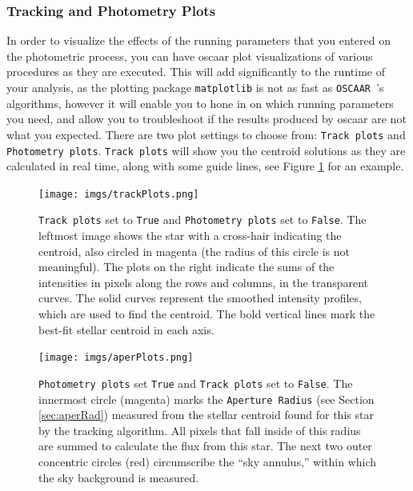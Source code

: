 \documentclass[a4paper]{article}
\newcommand{\code}[1]{\texttt{#1}}
\newcommand{\oscaar}{\code{OSCAAR}~}
\begin{document}
\subsubsection{Tracking and Photometry Plots} \label{sec:trackandphotplots}
In order to visualize the effects of the running parameters that you entered on the photometric process, you can have oscaar plot visualizations of various procedures as they are executed. This will add significantly to the runtime of your analysis, as the plotting package \code{matplotlib} is not as fast as \oscaar's algorithms, however it will enable you to hone in on which running parameters you need, and allow you to troubleshoot if the results produced by oscaar are not what you expected. There are two plot settings to choose from: \code{Track plots} and \code{Photometry plots}.  \code{Track plots} will show you the centroid solutions as they are calculated in real time, along with some guide lines, see Figure \ref{fig:trackingExamples} for an example. 

\begin{figure}[H]
\begin{center}
\texttt{[image: imgs/trackPlots.png]}
\caption{\code{Track plots} set to \code{True} and \code{Photometry plots} set to \code{False}. The leftmost image shows the star with a cross-hair indicating the centroid, also circled in magenta (the radius of this circle is not meaningful). The plots on the right indicate the sums of the intensities in pixels along the rows and columns, in the transparent curves. The solid curves represent the smoothed intensity profiles, which are used to find the centroid. The bold vertical lines mark the best-fit stellar centroid in each axis.}
\label{fig:trackingExamples}
\end{center}	
\end{figure}

\begin{figure}[H]
\begin{center}
\texttt{[image: imgs/aperPlots.png]}
\caption{\code{Photometry plots} set \code{True} and \code{Track plots} set to \code{False}. The innermost circle (magenta) marks the \code{Aperture Radius} (see Section \ref{sec:aperRad}) measured from the stellar centroid found for this star by the tracking algorithm. All pixels that fall inside of this radius are summed to calculate the flux from this star. The next two outer concentric circles (red) circumscribe the ``sky annulus,'' within which the sky background is measured. }
\label{fig:photPlots}
\end{center}	
\end{figure}
\end{document}
